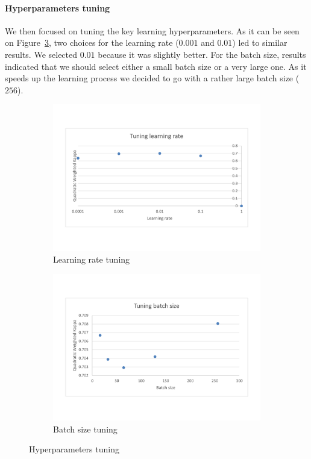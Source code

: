 \documentclass[a4paper,12pt,english]{article}
\begin{document}
\paragraph{Hyperparameters tuning} We then focused on tuning the key learning hyperparameters. As it can be seen on Figure~\ref{fig:hyper}, two choices for the learning rate ($0.001$ and $0.01$) led to similar results. We selected $0.01$ because it was slightly better. For the batch size, results indicated that we should select either a small batch size or a very large one. As it speeds up the learning process we decided to go with a rather large batch size ($256$).

\begin{figure}
	\vspace*{-1.5cm}
	\begin{subfigure}{0.5\textwidth}
		\includegraphics[width=1.15\linewidth]{fig/tune_lr.pdf}
		\caption{Learning rate tuning}
		\label{fig:hyper:lr}
	\end{subfigure}
	\begin{subfigure}{0.5\textwidth}
		\includegraphics[width=1.15\linewidth]{fig/tune_bs.pdf}
		\caption{Batch size tuning}
		\label{fig:hyper:batch}
	\end{subfigure}
	\caption{Hyperparameters tuning}
	\label{fig:hyper}
\end{figure}
\end{document}

